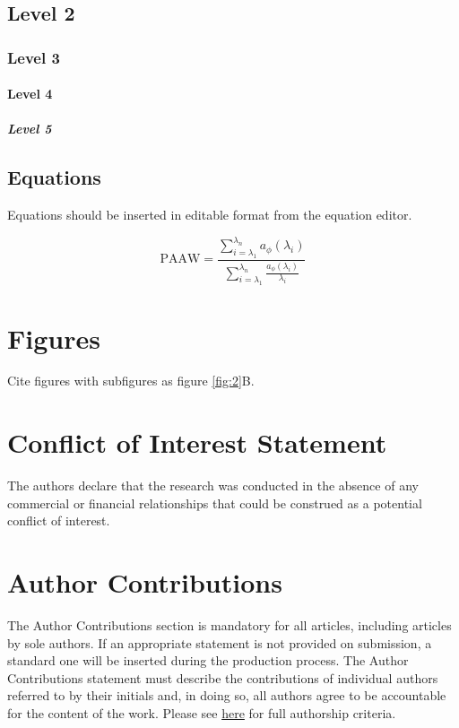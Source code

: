 \documentclass[utf8]{frontiersSCNS} %
\begin{document}

\subsection{Level 2}
\subsubsection{Level 3}
\paragraph{Level 4}
\subparagraph{Level 5}

\subsection{Equations}
Equations should be inserted in editable format from the equation editor.

\begin{equation}
    \text{PAAW}=\frac{\sum\limits^{\lambda_n}_{i=\lambda_1}a_\phi(\lambda_i)}{\sum\limits^{\lambda_n}_{i=\lambda_1}\frac{a_\phi(\lambda_i)}{\lambda_i}}\label{eq:01}
\end{equation}

\section*{Figures}

Cite figures with subfigures as figure \ref{fig:2}B.

\section*{Conflict of Interest Statement}

The authors declare that the research was conducted in the absence of any commercial or financial relationships that could be construed as a potential conflict of interest.

\section*{Author Contributions}

The Author Contributions section is mandatory for all articles, including articles by sole authors. If an appropriate statement is not provided on submission, a standard one will be inserted during the production process. The Author Contributions statement must describe the contributions of individual authors referred to by their initials and, in doing so, all authors agree to be accountable for the content of the work. Please see  \href{http://home.frontiersin.org/about/author-guidelines#AuthorandContributors}{here} for full authorship criteria.
\end{document}
